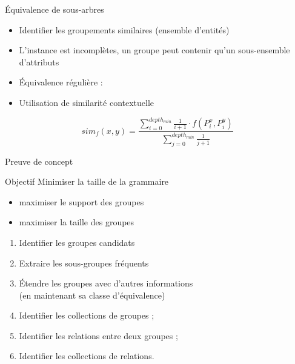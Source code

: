 \begin{frame}{Équivalence de sous-arbres}
    \begin{itemize}
        \item Identifier les groupements similaires (ensemble d'entités)
        \item L'instance est incomplètes, un groupe peut contenir qu'un sous-ensemble d'attributs
              \pause
        \item Équivalence régulière : 
              \pause
        \item Utilisation de similarité contextuelle
    \end{itemize}

    \vfill

    \begin{equation*}
        sim_f(x, y) = \frac{\sum_{i=0}^{depth_{min}} \frac{1}{i + 1} \cdot f(P^x_i, P^y_i)}{\sum_{j=0}^{depth_{min}} \frac{1}{j + 1}} \label{eq:struct:sim}
    \end{equation*}
\end{frame}

\begin{frame}{Preuve de concept}
    \begin{block}{Objectif}
        Minimiser la taille de la grammaire
        \pause
        \begin{itemize}
            \item maximiser le support des groupes
            \item maximiser la taille des groupes
        \end{itemize}
    \end{block}

    \vfill
    \pause

    \begin{enumerate}
        \item Identifier les groupes candidats
        \item Extraire les sous-groupes fréquents
        \item Étendre les groupes avec d'autres informations\\(en maintenant sa classe d'équivalence)
        \item Identifier les collections de groupes ;
        \item Identifier les relations entre deux groupes ;
        \item Identifier les collections de relations.
    \end{enumerate}
\end{frame}

